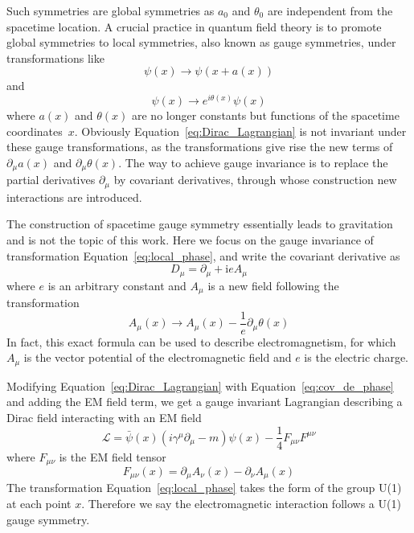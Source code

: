 Such symmetries are global symmetries as $a_{0}$ and $\theta_{0}$ are independent from the spacetime location.
A crucial practice in quantum field theory is to promote global symmetries to local symmetries, 
also known as gauge symmetries, under transformations like
\begin{equation}\label{eq:local_space}
  \psi(x) \to \psi(x+a(x))
\end{equation}
and 
\begin{equation}\label{eq:local_phase}
 \psi(x) \to e^{i\theta(x)}\psi(x)
\end{equation}
where $a(x)$ and $\theta(x)$ are no longer constants but functions of the spacetime coordinates~$x$.
Obviously Equation~\ref{eq:Dirac_Lagrangian} is not invariant under these gauge transformations, 
as the transformations give rise the new terms of $\partial_{\mu}a(x)$ and $\partial_{\mu}\theta(x)$.
The way to achieve gauge invariance is to replace the partial derivatives $\partial_{\mu}$ by covariant derivatives, 
through whose construction new interactions are introduced.

The construction of spacetime gauge symmetry essentially leads to gravitation and is not the topic of this work.
Here we focus on the gauge invariance of transformation Equation~\ref{eq:local_phase}, 
and write the covariant derivative as 
\begin{equation}\label{eq:cov_de_phase}
    D_{\mu} = \partial_{\mu} + \text{i}eA_{\mu}
\end{equation}
where $e$ is an arbitrary constant and $A_{\mu}$ is a new field following the transformation
\begin{equation}\label{eq:EM_transformation}
    A_{\mu}(x) \to A_{\mu}(x) - \frac{1}{e}\partial_{\mu}\theta(x)
\end{equation}
In fact, this exact formula can be used to describe electromagnetism, 
for which $A_{\mu}$ is the vector potential of the electromagnetic field and $e$ is the electric charge.

Modifying Equation~\ref{eq:Dirac_Lagrangian} with Equation~\ref{eq:cov_de_phase} and adding the EM field term, 
we get a gauge invariant Lagrangian describing a Dirac field interacting with an EM field
\begin{equation}\label{eq:Dirac_EM}
    \mathcal{L} = \bar{\psi}(x)(i\gamma^{\mu}\partial_{\mu}-m)\psi(x) - \frac{1}{4}F_{\mu\nu}F^{\mu\nu}
\end{equation}
where $F_{\mu\nu}$ is the EM field tensor
\begin{equation}\label{eq:EM_tensor}
    F_{\mu\nu}(x) = \partial_{\mu}A_{\nu}(x) - \partial_{\nu}A_{\mu}(x) 
\end{equation}
The transformation Equation~\ref{eq:local_phase} takes the form of the group U(1) at each point $x$.
Therefore we say the electromagnetic interaction follows a U(1) gauge symmetry.



